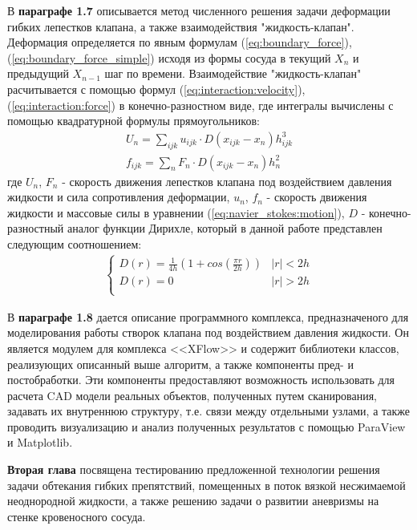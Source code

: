 В \textbf{параграфе 1.7} описывается метод численного решения задачи деформации
гибких лепестков клапана, а также взаимодействия "жидкость-клапан".  Деформация
определяется по явным формулам
(\ref{eq:boundary_force}),(\ref{eq:boundary_force_simple}) исходя из формы
сосуда в текущий $X_{n}$ и предыдущий $X_{n-1}$ шаг по времени.  Взаимодействие
"жидкость-клапан" расчитывается с помощью формул
(\ref{eq:interaction:velocity}), (\ref{eq:interaction:force}) в
конечно-разностном виде, где интегралы вычислены с помощью квадратурной формулы
прямоугольников:
\begin{gather}
    \label{eq:numerical_interpolation}
    U_n = \sum_{ijk}u_{ijk} \cdot D(x_{ijk} - x_n) h_{ijk}^3 \\
    \label{eq:numerical_spreading}
    f_{ijk} = \sum_n F_n \cdot D(x_{ijk} - x_n) h^2_n
\end{gather}
где $U_n$, $F_n$ - скорость движения лепестков клапана под воздействием
давления жидкости и сила сопротивления деформации, $u_n$, $f_n$ - скорость
движения жидкости и массовые силы в уравнении (\ref{eq:navier_stokes:motion}),
$D$ - конечно-разностный аналог функции Дирихле, который в данной работе
представлен следующим соотношением:
\begin{gather}
    \label{eq:numerical_dirichlet}
    \begin{cases}
        D(r) = \frac{1}{4h} (1 + cos(\frac{\pi r}{2h})) & |r| < 2h\\
        D(r) = 0 & |r| > 2h\\
    \end{cases}
\end{gather}


В \textbf{параграфе 1.8} дается описание программного комплекса,
предназначеного для моделирования работы створок клапана под воздействием
давления жидкости. Он является модулем для комплекса <<XFlow>> и содержит
библиотеки классов, реализующих описанный выше алгоритм, а также компоненты
пред- и постобработки. Эти компоненты предоставляют возможность использовать
для расчета CAD модели реальных объектов, полученных путем сканирования,
задавать их внутреннюю структуру, т.е.  связи между отдельными узлами, а также
проводить визуализацию и анализ полученных результатов с помощью ParaView и
Matplotlib.

\textbf{Вторая глава} посвящена тестированию предложенной технологии решения
задачи обтекания гибких препятствий, помещенных в поток вязкой несжимаемой
неоднородной жидкости, а также решению задачи о развитии аневризмы на стенке
кровеносного сосуда.

